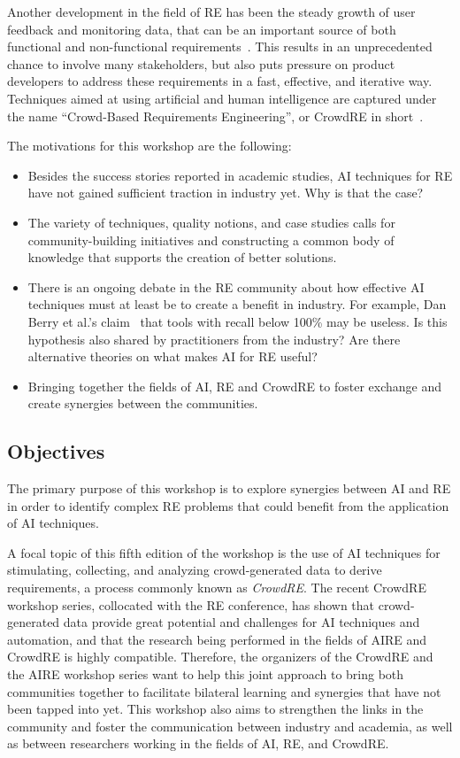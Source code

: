 \documentclass[conference,9pt]{IEEEtran}
\begin{document}
Another development in the field of RE has been the steady growth of user feedback and monitoring data, that can be an important source of both functional and non-functional requirements~\cite{Groen17a}. This results in an unprecedented chance to involve many stakeholders, but also puts pressure on product developers to address these requirements in a fast, effective, and iterative way. Techniques aimed at using artificial and human intelligence are captured under the name ``Crowd-Based Requirements Engineering'', or CrowdRE in short~\cite{Groen17b}.

The motivations for this workshop are the following:
\begin{itemize}
\item Besides the success stories reported in academic studies, AI techniques for RE have not gained sufficient traction in industry yet. Why is that the case?
\item The variety of techniques, quality notions, and case studies calls for community-building initiatives and constructing a common body of knowledge that supports the creation of better solutions.
\item There is an ongoing debate in the RE community about how effective AI techniques must at least be to create a benefit in industry. For example, Dan Berry et al.'s claim~\cite{Berry2012} that tools with recall below 100\% may be useless. Is this hypothesis also shared by practitioners from the industry? Are there alternative theories on what makes AI for RE useful?
\item Bringing together the fields of AI, RE and CrowdRE to foster exchange and create synergies between the communities.
\end{itemize}

\subsection{Objectives}
The primary purpose of this workshop is to explore synergies between AI and RE in order to identify complex RE problems that could benefit from the application of AI techniques. 

A focal topic of this fifth edition of the workshop is the use of AI techniques for stimulating, collecting, and analyzing crowd-generated data to derive requirements, a process commonly known as \textit{CrowdRE}. The recent CrowdRE workshop series, collocated with the RE conference, has shown that crowd-generated data provide great potential and challenges for AI techniques and automation, and that the research being performed in the fields of AIRE and CrowdRE is highly compatible. Therefore, the organizers of the CrowdRE and the AIRE workshop series want to help this joint approach to bring both communities together to facilitate bilateral learning and synergies that have not been tapped into yet.
This workshop also aims to strengthen the links in the community and foster the communication between industry and academia, as well as between researchers working in the fields of AI, RE, and CrowdRE. 
\end{document}
